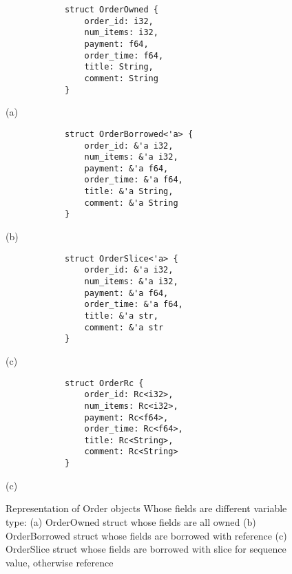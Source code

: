  \begin{figure}[htb]
    \begin{minipage}[t]{0.2\linewidth}\centering
        \begin{lstlisting}
            struct OrderOwned {
                order_id: i32,
                num_items: i32, 
                payment: f64,
                order_time: f64,
                title: String,
                comment: String
            } 
        \end{lstlisting}
      \medskip
      \centerline{(a)}
    \end{minipage}\hfill
    \begin{minipage}[t]{0.6\linewidth}\centering
        \begin{lstlisting}
            struct OrderBorrowed<'a> {
                order_id: &'a i32,
                num_items: &'a i32, 
                payment: &'a f64,
                order_time: &'a f64,
                title: &'a String,
                comment: &'a String
            }
        \end{lstlisting}
      \medskip
      \centerline{(b)}
    \end{minipage}
    \begin{minipage}[t]{0.2\linewidth}\centering
        \begin{lstlisting}
            struct OrderSlice<'a> {
                order_id: &'a i32,
                num_items: &'a i32, 
                payment: &'a f64,
                order_time: &'a f64,
                title: &'a str,
                comment: &'a str
            }
        \end{lstlisting}
      \medskip
      \centerline{(c)}
    \end{minipage}\hfill
    \begin{minipage}[t]{0.6\linewidth}\centering
        \begin{lstlisting}
            struct OrderRc {
                order_id: Rc<i32>,
                num_items: Rc<i32>,
                payment: Rc<f64>,
                order_time: Rc<f64>,
                title: Rc<String>,
                comment: Rc<String>
            }
        \end{lstlisting}
      \medskip
      \centerline{(c)}
    \end{minipage}\hfill
    \caption{Representation of Order objects Whose fields are different variable type: (a) OrderOwned struct whose fields are all owned 
    (b) OrderBorrowed struct whose fields are borrowed with reference (c) OrderSlice struct whose fields are borrowed with slice for sequence value, otherwise reference}
    \label{fig:order}
 \end{figure}

